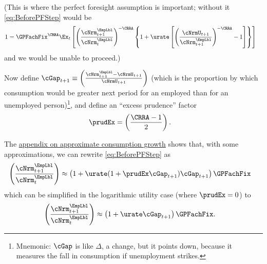 \documentclass{econark}
\begin{document}

(This is where the perfect foresight assumption is important; without it \eqref{eq:BeforePFStep} would be
\begin{equation}\begin{gathered}\begin{aligned}
 1       & =  \GPFachFix^{\CRRA} \Ex_{t}\left[\left(\frac{{\cNrm}^{\EmpLbl}_{t+1}}{{\cNrm}^{\EmpLbl}_{t}}\right)^{-\CRRA} \left\{1+\urate\left[\left(\frac{\cNrmU_{t+1}}{{\cNrm}^{\EmpLbl}_{t+1}}\right)^{-\CRRA}-1\right]\right\}\right] \label{eq:BeforePFStepWithEx}
\end{aligned}\end{gathered}\end{equation}
and we would be unable to proceed.)

Now define $\cGap _{t+1} \equiv \left(\frac{{\cNrm}^{\EmpLbl}_{t+1}-\cNrmU_{t+1}}{\cNrmU_{t+1}}\right)$ (which is the proportion by which consumption would be greater next period for an employed than for an unemployed person)\footnote{Mnemonic: $\cGap$ is like $\Delta$, a change, but it points down, because it measures the fall in consumption if unemployment strikes.}, and define an ``excess prudence'' factor
\begin{equation}\begin{gathered}\begin{aligned}
  \prudEx & =  \left(\frac{\CRRA-1}{2}\right).
\end{aligned}\end{gathered}\end{equation}

The \hyperref[sec:CGroApprox]{appendix on approximate consumption growth} shows that, with some approximations, we can rewrite \eqref{eq:BeforePFStep} as
\begin{equation}\begin{gathered}\begin{aligned}
         \left(\frac{{\cNrm}^{\EmpLbl}_{t+1}}{{\cNrm}^{\EmpLbl}_{t}}\right) & \approx  \left(1+ \urate (1+\prudEx\cGap _{t+1})\cGap _{t+1}\right) {\GPFachFix}
         \label{eq:cedelapprox}
\end{aligned}\end{gathered}\end{equation}
which can be simplified in the logarithmic utility case (where $\prudEx = 0$) to
\begin{equation}\begin{gathered}\begin{aligned}
         \left(\frac{{\cNrm}^{\EmpLbl}_{t+1}}{{\cNrm}^{\EmpLbl}_{t}}\right) & \approx  \left(1+ \urate \cGap _{t+1}\right) {\GPFachFix} \label{eq:cedelapproxLog}. 
\end{aligned}\end{gathered}\end{equation}
\end{document}

